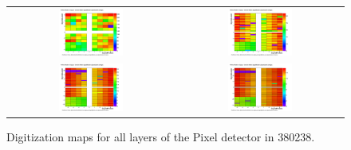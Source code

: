 \begin{figure}[h]
  \centering
  \begin{tabular}{cc}
    \includegraphics[width=0.4\textwidth]{images/num_digis_per_SignedModule_per_SignedLadder_PXLayer_1.png} & \includegraphics[width=0.4\textwidth]{images/num_digis_per_SignedModule_per_SignedLadder_PXLayer_2.png} \\
    \includegraphics[width=0.4\textwidth]{images/num_digis_per_SignedModule_per_SignedLadder_PXLayer_3.png} & \includegraphics[width=0.4\textwidth]{images/num_digis_per_SignedModule_per_SignedLadder_PXLayer_4.png} \\
  \end{tabular}
  \caption{Digitization maps for all layers of the Pixel detector in 380238.}
  \label{fig:digimaps_380238}
\end{figure}

